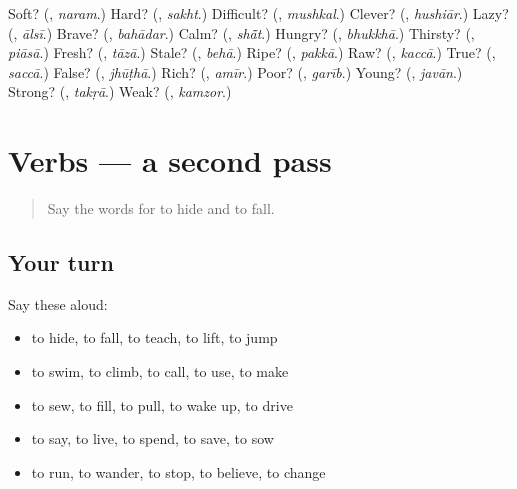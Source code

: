 \begin{tcolorbox}[breakable,colback=teal!4,colframe=teal!35!black,title={Before you move on}]
Soft? (\textbf{}, \emph{naram}.) Hard? (\textbf{}, \emph{sakht}.) Difficult? (\textbf{}, \emph{mushkal}.) Clever? (\textbf{}, \emph{hushiār}.) Lazy? (\textbf{}, \emph{ālsī}.) Brave? (\textbf{}, \emph{bahādar}.) Calm? (\textbf{}, \emph{shā̃t}.) Hungry? (\textbf{}, \emph{bhukkhā}.) Thirsty? (\textbf{}, \emph{piāsā}.) Fresh? (\textbf{}, \emph{tāzā}.) Stale? (\textbf{}, \emph{behā}.) Ripe? (\textbf{}, \emph{pakkā}.) Raw? (\textbf{}, \emph{kaccā}.) True? (\textbf{}, \emph{saccā}.) False? (\textbf{}, \emph{jhūṭhā}.) Rich? (\textbf{}, \emph{amīr}.) Poor? (\textbf{}, \emph{garīb}.) Young? (\textbf{}, \emph{javān}.) Strong? (\textbf{}, \emph{takṛā}.) Weak? (\textbf{}, \emph{kamzor}.)
\end{tcolorbox}
\section[(dialogue)]{Verbs — a second pass}

\label{lesson:PA-R152-second-pass-verbs}



\begin{quote}
Say the words for to hide and to fall.
\end{quote}

\subsection*{Your turn}
Say these aloud:

\begin{itemize}
\raggedright
  \item to hide, to fall, to teach, to lift, to jump
  \item to swim, to climb, to call, to use, to make
  \item to sew, to fill, to pull, to wake up, to drive
  \item to say, to live, to spend, to save, to sow
  \item to run, to wander, to stop, to believe, to change
\end{itemize}

